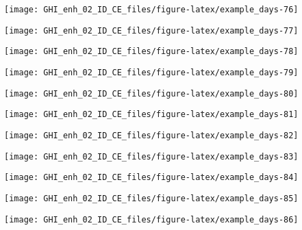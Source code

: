 \documentclass[
  10pt,
  a4paper,oneside]{article}
\begin{document}
\begin{center}\texttt{[image: GHI\_enh\_02\_ID\_CE\_files/figure-latex/example\_days-76]} \end{center}

\begin{center}\texttt{[image: GHI\_enh\_02\_ID\_CE\_files/figure-latex/example\_days-77]} \end{center}

\begin{center}\texttt{[image: GHI\_enh\_02\_ID\_CE\_files/figure-latex/example\_days-78]} \end{center}

\begin{center}\texttt{[image: GHI\_enh\_02\_ID\_CE\_files/figure-latex/example\_days-79]} \end{center}

\begin{center}\texttt{[image: GHI\_enh\_02\_ID\_CE\_files/figure-latex/example\_days-80]} \end{center}

\begin{center}\texttt{[image: GHI\_enh\_02\_ID\_CE\_files/figure-latex/example\_days-81]} \end{center}

\begin{center}\texttt{[image: GHI\_enh\_02\_ID\_CE\_files/figure-latex/example\_days-82]} \end{center}

\begin{center}\texttt{[image: GHI\_enh\_02\_ID\_CE\_files/figure-latex/example\_days-83]} \end{center}

\begin{center}\texttt{[image: GHI\_enh\_02\_ID\_CE\_files/figure-latex/example\_days-84]} \end{center}

\begin{center}\texttt{[image: GHI\_enh\_02\_ID\_CE\_files/figure-latex/example\_days-85]} \end{center}

\begin{center}\texttt{[image: GHI\_enh\_02\_ID\_CE\_files/figure-latex/example\_days-86]} \end{center}
\end{document}
